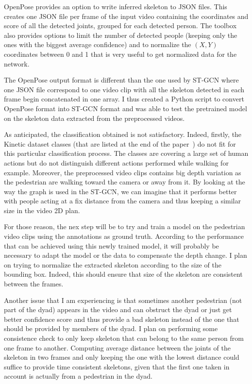 \documentclass[12pt,a4paper,twoside]{article}
\begin{document}
OpenPose provides an option to write inferred skeleton to JSON files. This creates one JSON file per frame of the input video containing the coordinates and score of all the detected joints, grouped for each detected person. The toolbox also provides options to limit the number of detected people (keeping only the ones with the biggest average confidence) and to normalize the $(X,Y)$ coordinates between 0 and 1 that is very useful to get normalized data for the network.

The OpenPose output format is different than the one used by ST-GCN where one JSON file correspond to one video clip with all the skeleton detected in each frame begin concatenated in one array. I thus created a Python script to convert OpenPose format into ST-GCN format and was able to test the pretrained model on the skeleton data extracted from the preprocessed videos.

As anticipated, the classification obtained is not satisfactory. Indeed, firstly, the Kinetic dataset classes (that are listed at the end of the paper~\cite{Kay2017}) do not fit for this particular classification process. The classes are covering a large set of human actions but do not distinguish different actions performed while walking for example. Moreover, the preprocessed video clips contains big depth variation as the pedestrian are walking toward the camera or away from it. By looking at the way the graph is used in the ST-GCN, we can imagine that it performs better with people acting at a fix distance from the camera and thus keeping a similar size in the video 2D plan. 

For those reason, the nex step will be to try and train a model on the pedestrian video clips using the annotations as ground truth. According to the performance that can be achieved using this newly trained model, it will probably be necessary to adapt the model or the data to compensate the depth change. I plan on trying to normalize the extracted skeleton according to the size of the bounding box. Indeed, this should ensure that size of the skeleton are consistent between the frames.

Another issue that I am experiencing is that sometimes another pedestrian (not part of the dyad) appears in the video and can obstruct the dyad or just get better confidence score and thus provide a bad skeleton instead of the one that should be provided by members of the dyad. I plan on performing some consistence check to only keep skeleton that can belong to the same person from one frame to another. Computing average distance between the joints of the skeleton in two frames and only keeping the one with the lowest distance could suffice to provide time consistent skeletons, given that the first one taken in account is actually from a pedestrian in the dyad. 
\end{document}

